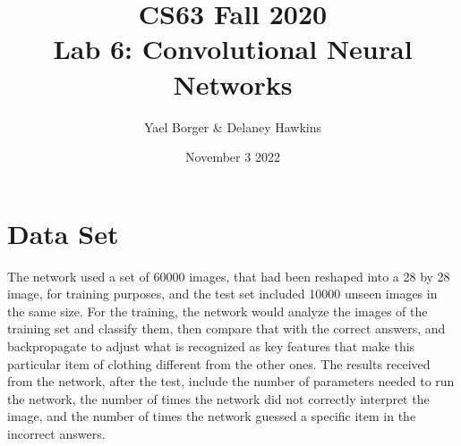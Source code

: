 \documentclass[11pt]{article}
\title{CS63 Fall 2020\\Lab 6: Convolutional Neural Networks}
\author{Yael Borger & Delaney Hawkins}%
\date{November 3 2022}
\begin{document}

\maketitle

\section{Data Set}
The network used a set of 60000 images, that had been reshaped into a 28 by 28 image, for training purposes, and the test set included 10000 unseen images in the same size. For the training, the network would analyze the images of the training set and classify them, then compare that with the correct answers, and backpropagate to adjust what is recognized as key features that make this particular item of clothing different from the other ones. The results received from the network, after the test, include the number of parameters needed to run the network, the number of times the network did not correctly interpret the image, and the number of times the network guessed a specific item in the incorrect answers.
\end{document}
